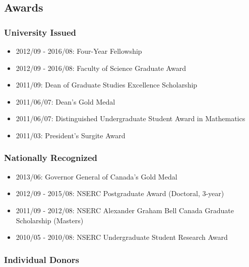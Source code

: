 \documentclass[]{article}
\providecommand{\tightlist}{%
  \setlength{\itemsep}{0pt}\setlength{\parskip}{0pt}}
\begin{document}
\hypertarget{awards}{%
\subsection{Awards}\label{awards}}

\hypertarget{university-issued}{%
\subsubsection{University Issued}\label{university-issued}}

\begin{itemize}
\tightlist
\item
  2012/09 - 2016/08: Four-Year Fellowship
\item
  2012/09 - 2016/08: Faculty of Science Graduate Award
\item
  2011/09: Dean of Graduate Studies Excellence Scholarship
\item
  2011/06/07: Dean's Gold Medal
\item
  2011/06/07: Distinguished Undergraduate Student Award in Mathematics
\item
  2011/03: President's Surgite Award
\end{itemize}

\hypertarget{nationally-recognized}{%
\subsubsection{Nationally Recognized}\label{nationally-recognized}}

\begin{itemize}
\tightlist
\item
  2013/06: Governor General of Canada's Gold Medal
\item
  2012/09 - 2015/08: NSERC Postgraduate Award (Doctoral, 3-year)
\item
  2011/09 - 2012/08: NSERC Alexander Graham Bell Canada Graduate Scholarship (Masters)
\item
  2010/05 - 2010/08: NSERC Undergraduate Student Research Award
\end{itemize}

\hypertarget{individual-donors}{%
\subsubsection{Individual Donors}\label{individual-donors}}
\end{document}
